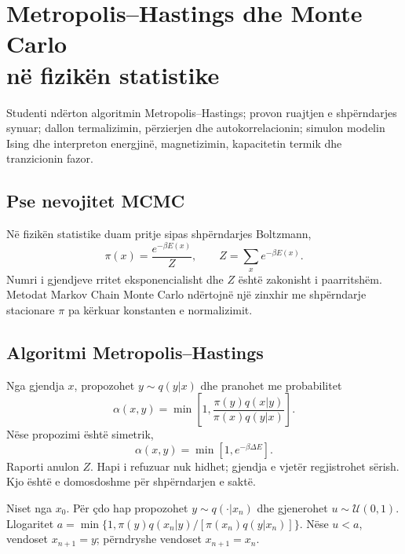 \chapter[Metropolis--Hastings dhe Monte Carlo në fizikën statistike]{Metropolis--Hastings dhe Monte Carlo\\në fizikën statistike}
\begin{qellime}
Studenti ndërton algoritmin Metropolis--Hastings; provon ruajtjen e shpërndarjes synuar; dallon termalizimin, përzierjen dhe autokorrelacionin; simulon modelin Ising dhe interpreton energjinë, magnetizimin, kapacitetin termik dhe tranzicionin fazor.
\end{qellime}

\section{Pse nevojitet MCMC}
Në fizikën statistike duam pritje sipas shpërndarjes Boltzmann,
\begin{equation}
 \pi(x)=\frac{e^{-\beta E(x)}}{Z},\qquad
 Z=\sum_xe^{-\beta E(x)}.
\end{equation}
Numri i gjendjeve rritet eksponencialisht dhe $Z$ është zakonisht i paarritshëm. Metodat Markov Chain Monte Carlo ndërtojnë një zinxhir me shpërndarje stacionare $\pi$ pa kërkuar konstanten e normalizimit.

\section{Algoritmi Metropolis--Hastings}
Nga gjendja $x$, propozohet $y\sim q(y|x)$ dhe pranohet me probabilitet
\begin{equation}
 \alpha(x,y)=\min\left[1,\frac{\pi(y)q(x|y)}{\pi(x)q(y|x)}\right].
\end{equation}
Nëse propozimi është simetrik,
\begin{equation}
 \alpha(x,y)=\min[1,e^{-\beta\Delta E}].
\end{equation}
Raporti anulon $Z$. Hapi i refuzuar nuk hidhet; gjendja e vjetër regjistrohet sërish. Kjo është e domosdoshme për shpërndarjen e saktë.

\begin{shembull}
Niset nga $x_0$. Për çdo hap propozohet $y\sim q(\cdot|x_n)$ dhe gjenerohet $u\sim\mathcal U(0,1)$. Llogaritet $a=\min\{1,\pi(y)q(x_n|y)/[\pi(x_n)q(y|x_n)]\}$. Nëse $u<a$, vendoset $x_{n+1}=y$; përndryshe vendoset $x_{n+1}=x_n$.
\end{shembull}

